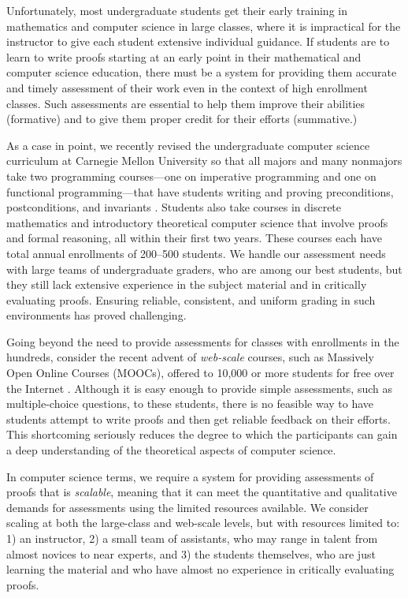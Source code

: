 \documentclass[12pt]{article}
\begin{document}
Unfortunately, most undergraduate students get their early training in
mathematics and computer science in large classes, where it is
impractical for the instructor to give each student extensive
individual guidance.  If students are to learn to write proofs
starting at an early point in their mathematical and computer science
education, there must be a system for providing them accurate and
timely assessment of their work even in the context of high enrollment
classes.  Such assessments are essential to help them improve their
abilities (formative) and to give them proper credit for their efforts
(summative.)

As a case in point, we recently revised the undergraduate computer science
curriculum at Carnegie Mellon University so that all majors and many
nonmajors take two programming courses---one on imperative programming
and one on functional programming---that have students writing and
proving preconditions, postconditions, and invariants
\cite{bryant-ugrad10}.  Students also take courses in
discrete mathematics and introductory theoretical computer science
that involve proofs and formal reasoning, all within their first two years.
These courses each have
total annual enrollments of 200--500 students.  We handle our
assessment needs with large teams of undergraduate graders, who are
among our best students, but they still lack extensive experience in
the subject material and in critically evaluating proofs.  Ensuring
reliable, consistent, and uniform grading in such environments has proved
challenging.

Going beyond the need to provide assessments for classes with
enrollments in the hundreds, consider the recent advent of {\em web-scale}
courses, such as Massively Open Online Courses (MOOCs),
 offered to 10,000 or more students for free over the Internet
\cite{carson-am12,lewin-nyt12}.
Although it is easy enough to provide simple
assessments, such as multiple-choice questions, to these students,
there is no feasible way to have students attempt to write proofs and
then get reliable feedback on their efforts.  This shortcoming
seriously reduces the degree to which the participants can gain a deep
understanding of the theoretical aspects of computer science.

In computer science terms, we require a system for providing
assessments of proofs that is {\em scalable}, meaning that it can meet
the quantitative and qualitative demands for assessments using the
limited resources available.  We consider scaling at both the
large-class and web-scale levels, but with 
resources limited to: 1) an instructor, 2) a small team of assistants,
who may range in talent from almost novices to near experts, and 3) the
students themselves, who are just learning the material and who have
almost no experience in critically evaluating proofs.
\end{document}
